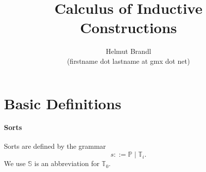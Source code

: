 \documentclass[12pt]{article}
\def\Prop{\mathbb{P}}
\def\Set{\mathbb{S}}
\def\Type{\mathbb{T}}
\theoremstyle{definition} \newtheorem{definition}{Definition}[section]
\theoremstyle{definition} \newtheorem{theorem}[definition]{Theorem}
\theoremstyle{definition} \newtheorem{lemma}[definition]{Lemma}
\begin{document}
\title{Calculus of Inductive Constructions}
\author{Helmut Brandl \\ \scriptsize (firstname dot lastname at gmx dot net)}
\date{}


\maketitle

\abstract{
}

\tableofcontents







\section{Basic Definitions}
\label{sec:terms}




\paragraph{Sorts} Sorts are defined by the grammar
$$ s  ::=  \Prop \mid \Type_i.$$
We use $\Set$ is an abbreviation for $\Type_0$.
\end{document}

